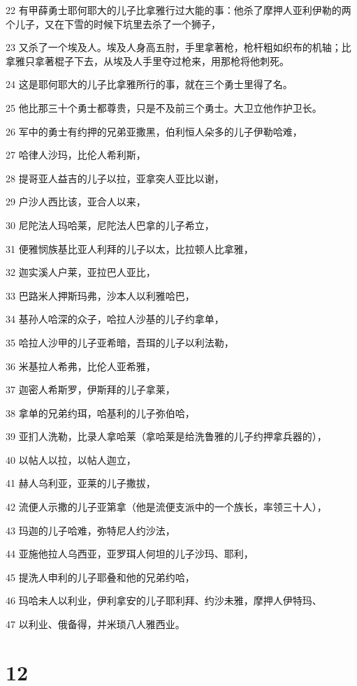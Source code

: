 \par 22 有甲薛勇士耶何耶大的儿子比拿雅行过大能的事：他杀了摩押人亚利伊勒的两个儿子，又在下雪的时候下坑里去杀了一个狮子，
\par 23 又杀了一个埃及人。埃及人身高五肘，手里拿著枪，枪杆粗如织布的机轴；比拿雅只拿著棍子下去，从埃及人手里夺过枪来，用那枪将他刺死。
\par 24 这是耶何耶大的儿子比拿雅所行的事，就在三个勇士里得了名。
\par 25 他比那三十个勇士都尊贵，只是不及前三个勇士。大卫立他作护卫长。
\par 26 军中的勇士有约押的兄弟亚撒黑，伯利恒人朵多的儿子伊勒哈难，
\par 27 哈律人沙玛，比伦人希利斯，
\par 28 提哥亚人益吉的儿子以拉，亚拿突人亚比以谢，
\par 29 户沙人西比该，亚合人以来，
\par 30 尼陀法人玛哈莱，尼陀法人巴拿的儿子希立，
\par 31 便雅悯族基比亚人利拜的儿子以太，比拉顿人比拿雅，
\par 32 迦实溪人户莱，亚拉巴人亚比，
\par 33 巴路米人押斯玛弗，沙本人以利雅哈巴，
\par 34 基孙人哈深的众子，哈拉人沙基的儿子约拿单，
\par 35 哈拉人沙甲的儿子亚希暗，吾珥的儿子以利法勒，
\par 36 米基拉人希弗，比伦人亚希雅，
\par 37 迦密人希斯罗，伊斯拜的儿子拿莱，
\par 38 拿单的兄弟约珥，哈基利的儿子弥伯哈，
\par 39 亚扪人洗勒，比录人拿哈莱（拿哈莱是给洗鲁雅的儿子约押拿兵器的），
\par 40 以帖人以拉，以帖人迦立，
\par 41 赫人乌利亚，亚莱的儿子撒拔，
\par 42 流便人示撒的儿子亚第拿（他是流便支派中的一个族长，率领三十人），
\par 43 玛迦的儿子哈难，弥特尼人约沙法，
\par 44 亚施他拉人乌西亚，亚罗珥人何坦的儿子沙玛、耶利，
\par 45 提洗人申利的儿子耶叠和他的兄弟约哈，
\par 46 玛哈未人以利业，伊利拿安的儿子耶利拜、约沙未雅，摩押人伊特玛、
\par 47 以利业、俄备得，并米琐八人雅西业。

\chapter{12}

